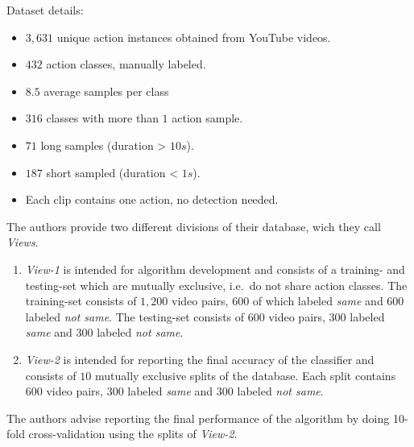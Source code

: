 Dataset details: \cite{kliper-gross_action_2012}
\begin{itemize}
    \item $3,631$ unique action instances obtained from YouTube videos.
    \item $432$ action classes, manually labeled.
    \item $8.5$ average samples per class
    \item $316$ classes with more than $1$ action sample.
    \item $71$ long samples (duration > $10s$).
    \item $187$ short sampled (duration < $1s$).
    \item Each clip contains one action, no detection needed.
\end{itemize}

The authors provide two different divisions of their database, wich they call \textit{Views}.

\begin{enumerate}
    \item \textit{View-1} is intended for algorithm development and consists of a training- and testing-set which are mutually exclusive, i.e.\ do not share action classes.
        The training-set consists of $1,200$ video pairs, $600$ of which labeled \textit{same} and $600$ labeled \textit{not same}.
        The testing-set consists of $600$ video pairs, $300$ labeled \textit{same} and $300$ labeled \textit{not same}.
    \item \textit{View-2} is intended for reporting the final accuracy of the classifier and consists of $10$ mutually exclusive splits of the database.
        Each split contains 600 video pairs, $300$ labeled \textit{same} and $300$ labeled \textit{not same}.
\end{enumerate}
The authors advise reporting the final performance of the algorithm by doing 10-fold cross-validation using the splits of \textit{View-2}.

